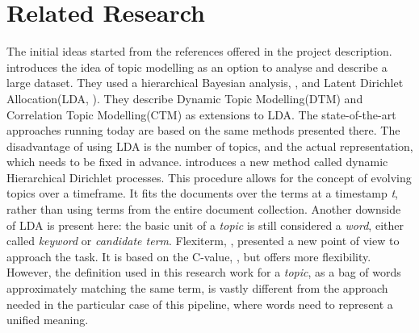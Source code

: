 \documentclass[12pt,MSc,a4paper,oneside]{muthesis}
\begin{document}
\section{Related Research}
The initial ideas started from the references offered in the project description. \cite{lafferty_blei_2009} introduces the idea of topic modelling as an option to analyse and describe a large dataset. They used a hierarchical Bayesian analysis, \cite{ghosh2006introduction}, and Latent Dirichlet Allocation(LDA, \cite{blei2003latent}). They describe Dynamic Topic Modelling(DTM) and Correlation Topic Modelling(CTM) as extensions to LDA. The state-of-the-art approaches running today are based on the same methods presented there. The disadvantage of using LDA is the number of topics, and the actual representation, which needs to be fixed in advance.
\cite{Blei2010ProbabilisticTM} introduces a new method called dynamic Hierarchical Dirichlet processes. This procedure allows for the concept of evolving topics over a timeframe. It fits the documents over the terms at a timestamp \textit{t}, rather than using terms from the entire document collection. Another downside of LDA is present here: the basic unit of a \textit{topic} is still considered a \textit{word}, either called \textit{keyword} or \textit{candidate term}.
Flexiterm, \cite{Spasi2013FlexiTermAF}, presented a new point of view to approach the task. It is based on the C-value, \cite{Frantzi2000AutomaticRO}, but offers more flexibility. However, the definition used in this research work for a \textit{topic}, as a bag of words approximately matching the same term, is vastly different from the approach needed in the particular case of this pipeline, where words need to represent a unified meaning.
\end{document}
